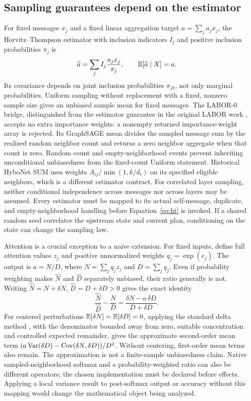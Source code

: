 \subsection{Sampling guarantees depend on the estimator}
For fixed messages $x_j$ and a fixed linear aggregation target $a=\sum_j a_jx_j$, the Horvitz--Thompson estimator \cite{horvitz1952generalization} with inclusion indicators $I_j$ and positive inclusion probabilities $\pi_j$ is
\begin{equation}
\widehat a=\sum_j I_j\frac{a_jx_j}{\pi_j},\qquad \mathbb E[\widehat a\mid X]=a.
\label{eq:ht}
\end{equation}
Its covariance depends on joint inclusion probabilities $\pi_{jk}$, not only marginal probabilities. Uniform sampling without replacement with a fixed, nonzero sample size gives an unbiased sample mean for fixed messages. The LABOR-0 bridge, distinguished from the estimator guarantee in the original LABOR work \cite{balin2023labor}, accepts no extra importance weights: a nonempty returned importance-weight array is rejected. Its GraphSAGE mean divides the sampled message sum by the realized random neighbor count and returns a zero neighbor aggregate when that count is zero. Random count and empty-neighborhood events prevent inheriting unconditional unbiasedness from the fixed-count Uniform statement. Historical HyboNet SUM uses weights $A_{ij}/\min(1,k/d_i)$ on its specified eligible neighbors, which is a different estimator contract. For correlated layer sampling, neither conditional independence across messages nor across layers may be assumed. Every estimator must be mapped to its actual self-message, duplicate, and empty-neighborhood handling before Equation~\eqref{eq:ht} is invoked. If a shared random seed correlates the upstream state and current plan, conditioning on the state can change the sampling law.

Attention is a crucial exception to a naive extension. For fixed inputs, define full attention values $z_j$ and positive unnormalized weights $q_j=\exp(e_j)$. The output is $a=N/D$, where $N=\sum_jq_jz_j$ and $D=\sum_jq_j$. Even if probability weighting makes $\widehat N$ and $\widehat D$ separately unbiased, their ratio generally is not. Writing $\widehat N=N+\delta N$, $\widehat D=D+\delta D>0$ gives the exact identity
\begin{equation}
\frac{\widehat N}{\widehat D}-\frac ND
=\frac{\delta N-a\,\delta D}{D+\delta D}.
\label{eq:ratio}
\end{equation}
For centered perturbations $\mathbb E[\delta N]=\mathbb E[\delta D]=0$, applying the standard delta method \cite{oehlert1992delta}, with the denominator bounded away from zero, suitable concentration and controlled expected remainder, gives the approximate second-order mean term $(a\operatorname{Var}(\delta D)-\operatorname{Cov}(\delta N,\delta D))/D^2$. Without centering, first-order mean terms also remain. The approximation is not a finite-sample unbiasedness claim. Native sampled-neighborhood softmax and a probability-weighted ratio can also be different operators; the chosen implementation must be declared before effects. Applying a local variance result to post-softmax output or accuracy without this mapping would change the mathematical object being analyzed.

